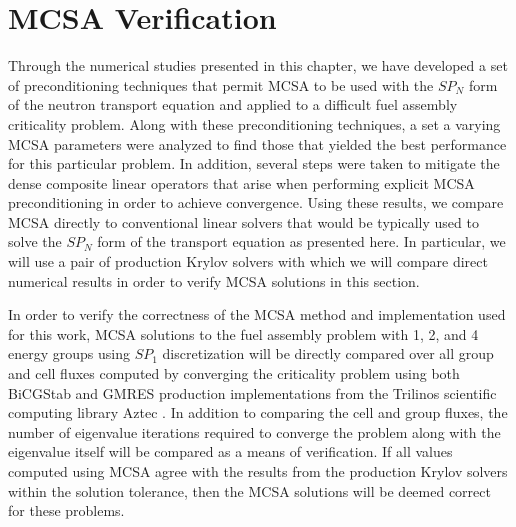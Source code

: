 \clearpage

\section{MCSA Verification\ }
\label{sec:spn_mcsa_verification}
Through the numerical studies presented in this chapter, we have
developed a set of preconditioning techniques that permit MCSA to be
used with the $SP_N$ form of the neutron transport equation and
applied to a difficult fuel assembly criticality problem. Along with
these preconditioning techniques, a set a varying MCSA parameters were
analyzed to find those that yielded the best performance for this
particular problem. In addition, several steps were taken to mitigate
the dense composite linear operators that arise when performing
explicit MCSA preconditioning in order to achieve convergence. Using
these results, we compare MCSA directly to conventional linear solvers
that would be typically used to solve the $SP_N$ form of the transport
equation as presented here. In particular, we will use a pair of
production Krylov solvers with which we will compare direct numerical
results in order to verify MCSA solutions in this section.

In order to verify the correctness of the MCSA method and
implementation used for this work, MCSA solutions to the fuel assembly
problem with 1, 2, and 4 energy groups using $SP_1$ discretization
will be directly compared over all group and cell fluxes computed by
converging the criticality problem using both BiCGStab and GMRES
production implementations from the Trilinos scientific computing
library Aztec \cite{heroux_overview_2005}. In addition to comparing
the cell and group fluxes, the number of eigenvalue iterations
required to converge the problem along with the eigenvalue itself will
be compared as a means of verification. If all values computed using
MCSA agree with the results from the production Krylov solvers within
the solution tolerance, then the MCSA solutions will be deemed correct
for these problems.

